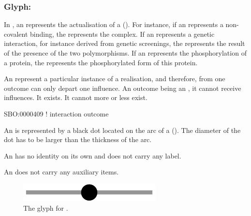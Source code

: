 
\subsubsection{Glyph: }\label{sec:outcome}

In \ERs, an  represents the actualisation of a  (). For instance, if an  represents a non-covalent binding, the  represents the complex. If an  represents a genetic interaction, for instance derived from genetic screenings, the  represents the result of the presence of the two polymorphisms. If an  represents the phosphorylation of a protein, the  represents the phosphorylated form of this protein.

An  represent a particular instance of a realisation, and therefore, from one outcome can only depart one influence. An outcome being an , it cannot receive influences. It exists. It cannot more or less exist. 

\begin{glyphDescription}

\glyphSboTerm SBO:0000409 ! interaction outcome

\glyphContainer  An  is represented by a black dot located on the arc of a  (). The diameter of the dot has to be larger than the thickness of the arc.

\glyphLabel An  has no identity on its own and does not carry any label. 

\glyphAux An  does not carry any auxiliary items.

\end{glyphDescription}

\begin{figure}[H]
  \centering
  \includegraphics[scale = 0.5]{images/outcome}
  \caption{The \ER glyph for .}
  \label{fig:outcome}
\end{figure}

